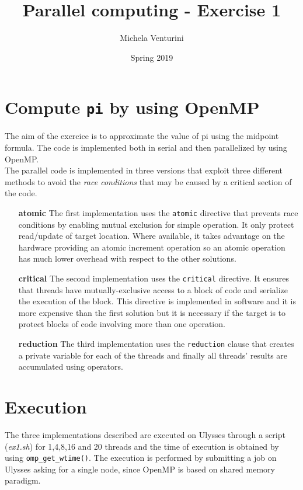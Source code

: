 \documentclass[]{scrartcl}
\title{\textbf{Parallel computing - Exercise 1}}
\author{Michela Venturini}
\date{Spring 2019}
\begin{document}
\maketitle

\section{Compute \texttt{pi} by using OpenMP}
The aim of the exercice is to approximate the value of pi using the midpoint formula. The code is implemented both in serial and then parallelized by using OpenMP.\\ The parallel code is implemented in three versions that exploit three different methods to avoid the \textit{race conditions} that may be caused by a critical section of the code.
\begin{itemize}
\item[\textbf{atomic}] The first implementation uses the \texttt{atomic} directive that prevents race conditions by enabling mutual exclusion for simple operation. It only protect read/update of target location. Where available, it takes advantage on the hardware providing an atomic increment operation so an atomic operation has much lower overhead with respect to the other solutions.
\item[\textbf{critical}] The second implementation uses the \texttt{critical} directive. It ensures that threads have mutually-exclusive access to a block of code and serialize the execution of the block. This directive is implemented in software and it is more expensive than the first solution but it is necessary if the target is to protect blocks of code involving more than one operation. 
\item[\textbf{reduction}] The third implementation uses the \texttt{reduction} clause that creates a private variable for each of the threads and finally all threads' results are accumulated using operators.
\end{itemize}

\section{Execution}
The three implementations described are executed on Ulysses through a script (\textit{ex1.sh}) for 1,4,8,16 and 20 threads and the time of execution is obtained by using \texttt{omp\_get\_wtime()}.
The execution is performed by submitting a job on Ulysses asking for a single node, since OpenMP is based on shared memory paradigm.
\end{document}
